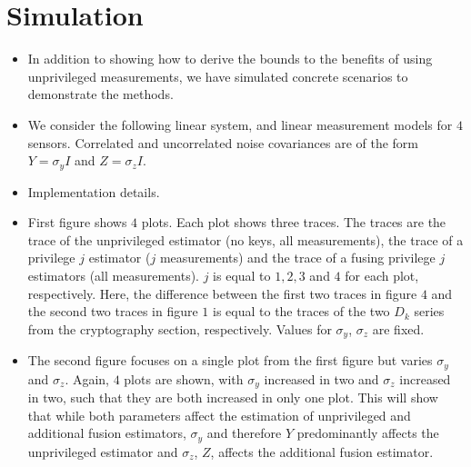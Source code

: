 \documentclass[conference]{IEEEtran}
\begin{document}
% 
%                                 
%                                 
%                                 
% 

\section{Simulation}\label{sec:sim}
\begin{itemize}
  \item In addition to showing how to derive the bounds to the benefits of using unprivileged measurements, we have simulated concrete scenarios to demonstrate the methods.
  \item We consider the following linear system, and linear measurement models for $4$ sensors. Correlated and uncorrelated noise covariances are of the form $Y=\sigma_y I$ and $Z = \sigma_z I$.
  \item Implementation details.
  \item First figure shows $4$ plots. Each plot shows three traces. The traces are the trace of the unprivileged estimator (no keys, all measurements), the trace of a privilege $j$ estimator ($j$ measurements) and the trace of a fusing privilege $j$ estimators (all measurements). $j$ is equal to $1,2,3$ and $4$ for each plot, respectively. Here, the difference between the first two traces in figure $4$ and the second two traces in figure $1$ is equal to the traces of the two $D_k$ series from the cryptography section, respectively. Values for $\sigma_y$, $\sigma_z$ are fixed.
  \item The second figure focuses on a single plot from the first figure but varies $\sigma_y$ and $\sigma_z$. Again, $4$ plots are shown, with $\sigma_y$ increased in two and $\sigma_z$ increased in two, such that they are both increased in only one plot. This will show that while both parameters affect the estimation of unprivileged and additional fusion estimators, $\sigma_y$ and therefore $Y$ predominantly affects the unprivileged estimator and $\sigma_z$, $Z$, affects the additional fusion estimator.
\end{itemize}

% 
%                                               
%                                               
%                                               
% 
\end{document}
